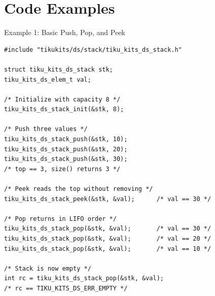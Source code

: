 \documentclass[aspectratio=169, 10pt]{beamer}
\begin{document}
\section{Code Examples}

\begin{frame}[fragile]{Example 1: Basic Push, Pop, and Peek}
\begin{lstlisting}[style=cstyle,
  title={Basic stack operations}]
#include "tikukits/ds/stack/tiku_kits_ds_stack.h"

struct tiku_kits_ds_stack stk;
tiku_kits_ds_elem_t val;

/* Initialize with capacity 8 */
tiku_kits_ds_stack_init(&stk, 8);

/* Push three values */
tiku_kits_ds_stack_push(&stk, 10);
tiku_kits_ds_stack_push(&stk, 20);
tiku_kits_ds_stack_push(&stk, 30);
/* top == 3, size() returns 3 */

/* Peek reads the top without removing */
tiku_kits_ds_stack_peek(&stk, &val);      /* val == 30 */

/* Pop returns in LIFO order */
tiku_kits_ds_stack_pop(&stk, &val);       /* val == 30 */
tiku_kits_ds_stack_pop(&stk, &val);       /* val == 20 */
tiku_kits_ds_stack_pop(&stk, &val);       /* val == 10 */

/* Stack is now empty */
int rc = tiku_kits_ds_stack_pop(&stk, &val);
/* rc == TIKU_KITS_DS_ERR_EMPTY */
\end{lstlisting}
\end{frame}
\end{document}
